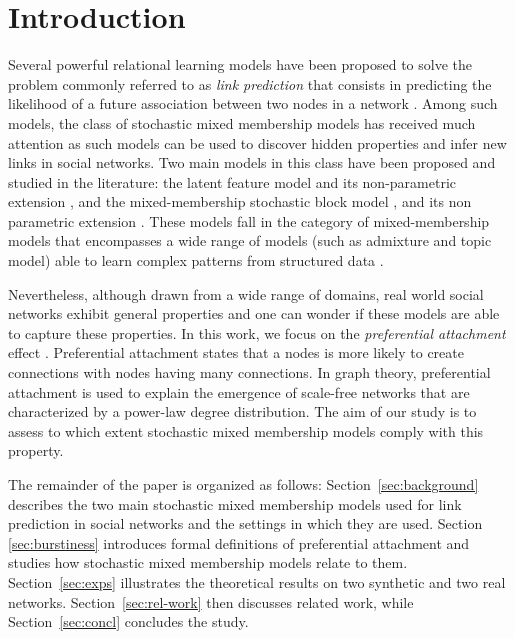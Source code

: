 
\section{Introduction}
\label{sec:intro}

Several powerful relational learning models have been proposed to solve the problem commonly referred to as \textit{link prediction} that consists in predicting the likelihood of a future association between two nodes in a network \cite{LibenNowell07,HassanZaki11}. Among such models, the class of stochastic mixed membership models has received much attention as such models can be used to discover hidden properties and infer new links in social networks. Two main models in this class have been proposed and studied in the literature: the latent feature model \cite{meeds2006modeling} and its non-parametric extension \cite{miller2009nonparametric}, and the mixed-membership stochastic block model \cite{airoldi2009mixed}, and its non parametric extension \cite{koutsourelakis2008finding,fan2015dynamic}. These models fall in the category of mixed-membership models that encompasses a wide range of models (such as admixture and topic model) able to  learn complex patterns from structured data \cite{airoldi2014handbook}.

Nevertheless, although drawn from a wide range of domains, real world social networks exhibit general properties and one can wonder if these models are able to capture these properties. In this work, we focus on the \textit{preferential attachment} effect \cite{Newman2010, Barabasi2003}. Preferential attachment states that a nodes is more likely to create connections with nodes having many connections. In graph theory, preferential attachment is used to explain the emergence of scale-free networks that are characterized by a power-law degree distribution. The aim of our study is to assess to which extent stochastic mixed membership models comply with this property.

The remainder of the paper is organized as follows:  Section~\ref{sec:background} describes the two main stochastic mixed membership models used for link prediction in social networks and the settings in which they are used. Section \ref{sec:burstiness} introduces formal definitions of preferential attachment and studies how stochastic mixed membership models relate to them. Section~\ref{sec:exps} illustrates the theoretical results on two synthetic and two real networks. Section~\ref{sec:rel-work} then discusses related work, while Section~\ref{sec:concl} concludes the study.
